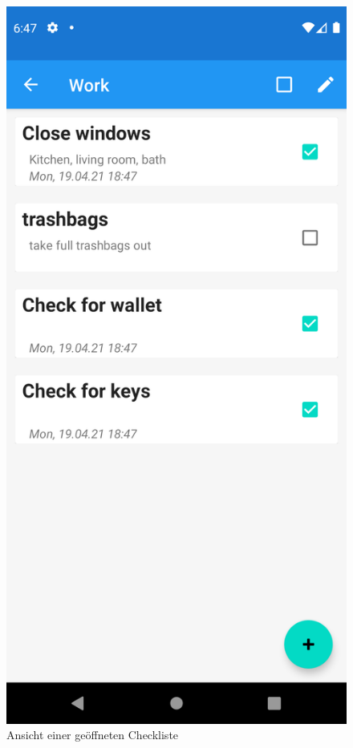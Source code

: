 \\
\begin{figure}[h]
	\centering
	\begin{minipage}{0.45\linewidth}
		\centering
		\includegraphics[width=.9\linewidth]{Bilder/TaskView.png}
		\caption{Ansicht einer geöffneten Checkliste}
		\label{fig:taskView}
	\end{minipage}

\end{figure}
